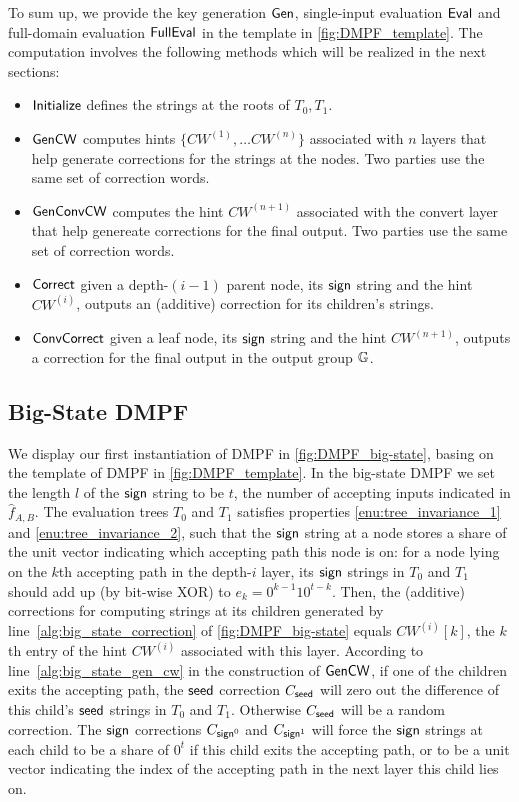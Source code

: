 To sum up, we provide the key generation ${\sf Gen}$, single-input evaluation ${\sf Eval}$ and full-domain evaluation ${\sf FullEval}$ in the template in \cref{fig:DMPF_template}. The computation involves the following methods which will be realized in the next sections: 
\begin{itemize}
  \item $\sf Initialize$ defines the strings at the roots of $T_0,T_1$.
  \item $\sf GenCW$ computes hints $\{CW^{(1)},\dots CW^{(n)}\}$ associated with $n$ layers that help generate corrections for the strings at the nodes. Two parties use the same set of correction words. 
  \item $\sf GenConvCW$ computes the hint $CW^{(n+1)}$ associated with the convert layer that help genereate corrections for the final output. Two parties use the same set of correction words. 
  \item $\sf Correct$ given a depth-$(i-1)$ parent node, its ${\sf sign}$ string and the hint $CW^{(i)}$, outputs an (additive) correction for its children's strings. 
  \item $\sf ConvCorrect$ given a leaf node, its ${\sf sign}$ string and the hint $CW^{(n+1)}$, outputs a correction for the final output in the output group $\mathbb{G}$. 
\end{itemize}


\subsection{Big-State DMPF}\label{sec:big_state_DMPF}
We display our first instantiation of DMPF in \cref{fig:DMPF_big-state}, basing on the template of DMPF in \cref{fig:DMPF_template}. In the big-state DMPF we set the length $l$ of the ${\sf sign}$ string to be $t$, the number of accepting inputs indicated in $\hat{f}_{A,B}$. The evaluation trees $T_0$ and $T_1$ satisfies properties \ref{enu:tree_invariance_1} and \ref{enu:tree_invariance_2}, such that the ${\sf sign}$ string at a node stores a share of the unit vector indicating which accepting path this node is on: for a node lying on the $k$th accepting path in the depth-$i$ layer, its ${\sf sign}$ strings in $T_0$ and $T_1$ should add up (by bit-wise XOR) to $e_k = 0^{k-1}10^{t-k}$. Then, the (additive) corrections for computing strings at its children generated by line~\ref{alg:big_state_correction} of \cref{fig:DMPF_big-state} equals $CW^{(i)}[k]$, the $k$th entry of the hint $CW^{(i)}$ associated with this layer. According to line~\ref{alg:big_state_gen_cw} in the construction of $\sf GenCW$, if one of the children exits the accepting path, the ${\sf seed}$ correction $C_{\sf seed}$ will zero out the difference of this child's ${\sf seed}$ strings in $T_0$ and $T_1$. Otherwise $C_{\sf seed}$ will be a random correction. The ${\sf sign}$ corrections $C_{{\sf sign}^0}$ and $C_{{\sf sign}^1}$ will force the ${\sf sign}$ strings at each child to be a share of $0^t$ if this child exits the accepting path, or to be a unit vector indicating the index of the accepting path in the next layer this child lies on. 

